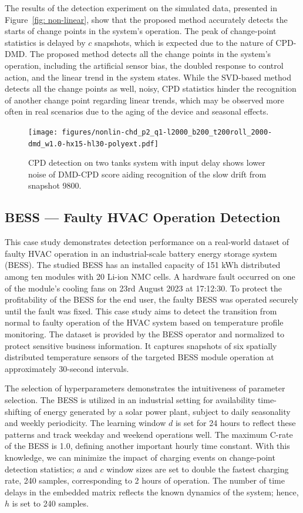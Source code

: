 The results of the detection experiment on the simulated data, presented in Figure~\ref{fig: non-linear}, show that the proposed method accurately detects the starts of change points in the system's operation. The peak of change-point statistics is delayed by \(c\) snapshots, which is expected due to the nature of CPD-DMD. The proposed method detects all the change points in the system's operation, including the artificial sensor bias, the doubled response to control action, and the linear trend in the system states. While the SVD-based method detects all the change points as well, noisy, CPD statistics hinder the recognition of another change point regarding linear trends, which may be observed more often in real scenarios due to the aging of the device and seasonal effects.

\begin{figure}[H]
    \centering
    \texttt{[image: figures/nonlin-chd\_p2\_q1-l2000\_b200\_t200roll\_2000-dmd\_w1.0-hx15-hl30-polyext.pdf]}
    \caption{CPD detection on two tanks system with input delay shows lower noise of DMD-CPD score aiding recognition of the slow drift from snapshot 9800.}\label{fig:nonlinear}
\end{figure}

\subsection{BESS --- Faulty HVAC Operation Detection}
This case study demonstrates detection performance on a real-world dataset of faulty HVAC operation in an industrial-scale battery energy storage system (BESS). The studied BESS has an installed capacity of 151 kWh distributed among ten modules with 20 Li-ion NMC cells. A hardware fault occurred on one of the module's cooling fans on 23rd August 2023 at 17:12:30. To protect the profitability of the BESS for the end user, the faulty BESS was operated securely until the fault was fixed. This case study aims to detect the transition from normal to faulty operation of the HVAC system based on temperature profile monitoring. The dataset is provided by the BESS operator and normalized to protect sensitive business information. It captures snapshots of six spatially distributed temperature sensors of the targeted BESS module operation at approximately 30-second intervals.

The selection of hyperparameters demonstrates the intuitiveness of parameter selection. The BESS is utilized in an industrial setting for availability time-shifting of energy generated by a solar power plant, subject to daily seasonality and weekly periodicity. The learning window \(d\) is set for 24 hours to reflect these patterns and track weekday and weekend operations well. The maximum C-rate of the BESS is 1.0, defining another important hourly time constant. With this knowledge, we can minimize the impact of charging events on change-point detection statistics; \(a\) and \(c\) window sizes are set to double the fastest charging rate, 240 samples, corresponding to 2 hours of operation. The number of time delays in the embedded matrix reflects the known dynamics of the system; hence, \(h\) is set to 240 samples.


